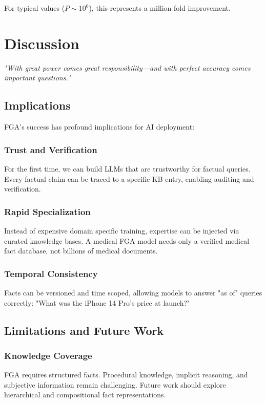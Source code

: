 \documentclass[11pt, a4paper]{article}
\theoremstyle{definition}
\begin{document}
For typical values ($P \sim 10^6$), this represents a million fold improvement.

\section{Discussion}

\textit{"With great power comes great responsibility—and with perfect accuracy comes important questions."}

\subsection{Implications}

FGA's success has profound implications for AI deployment:

\subsubsection{Trust and Verification}
For the first time, we can build LLMs that are trustworthy for factual queries. Every factual claim can be traced to a specific KB entry, enabling auditing and verification.

\subsubsection{Rapid Specialization}
Instead of expensive domain specific training, expertise can be injected via curated knowledge bases. A medical FGA model needs only a verified medical fact database, not billions of medical documents.

\subsubsection{Temporal Consistency}
Facts can be versioned and time scoped, allowing models to answer "as of" queries correctly: "What was the iPhone 14 Pro's price at launch?"

\subsection{Limitations and Future Work}

\subsubsection{Knowledge Coverage}
FGA requires structured facts. Procedural knowledge, implicit reasoning, and subjective information remain challenging. Future work should explore hierarchical and compositional fact representations.
\end{document}
